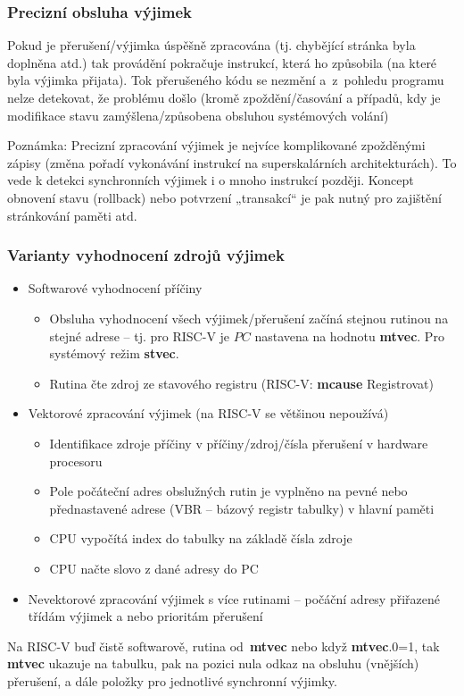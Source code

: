 \documentclass{beamer}
\begin{document}
\begin{frame}
\frametitle{Precizní obsluha výjimek}

Pokud je přerušení/výjimka úspěšně zpracována (tj. chybějící
stránka byla doplněna atd.) tak provádění pokračuje
instrukcí, která ho způsobila (na které byla výjimka přijata).
Tok přerušeného kódu se nezmění a~z~pohledu programu nelze
detekovat, že problému došlo (kromě zpoždění/časování a případů,
kdy je modifikace  stavu zamýšlena/způsobena obsluhou systémových
volání)

\vspace{3mm}

Poznámka: Precizní zpracování výjimek je nejvíce komplikované
zpožděnými zápisy (změna pořadí vykonávání instrukcí na superskalárních architekturách).
To vede k detekci synchronních výjimek i o mnoho
instrukcí později. Koncept obnovení stavu (rollback) nebo
potvrzení „transakcí“ je pak nutný pro zajištění stránkování paměti atd.
\end{frame}

\begin{frame}
\frametitle{Varianty vyhodnocení zdrojů výjimek}

\begin{itemize}
 \item Softwarové vyhodnocení příčiny
 \begin{itemize}
  \item Obsluha vyhodnocení všech výjimek/přerušení začíná stejnou rutinou na stejné adrese --
        tj. pro RISC-V je $PC$ nastavena na hodnotu \textbf{mtvec}. Pro systémový režim \textbf{stvec}.
  \item Rutina čte zdroj ze stavového registru (RISC-V: \textbf{mcause} Registrovat)
 \end{itemize}
 \item Vektorové zpracování výjimek (na RISC-V se většinou nepoužívá)
 \begin{itemize}
  \item Identifikace zdroje příčiny v příčiny/zdroj/čísla přerušení v hardware procesoru
  \item Pole počáteční adres obslužných rutin je vyplněno na pevné nebo přednastavené adrese
  (VBR -- bázový registr tabulky) v hlavní paměti
  \item CPU vypočítá index do tabulky na základě čísla zdroje
  \item CPU načte slovo z dané adresy do PC
 \end{itemize}
 \item Nevektorové zpracování výjimek s více rutinami -- počáční
       adresy přiřazené třídám výjimek a nebo prioritám přerušení
\end{itemize}

\footnotesize

Na RISC-V buď čistě softwarově, rutina od~\textbf{mtvec} nebo když \textbf{mtvec}.0=1, tak \textbf{mtvec} ukazuje na tabulku,
pak na pozici nula odkaz na obsluhu (vnějších) přerušení, a dále položky pro jednotlivé synchronní výjimky.
\end{frame}
\end{document}
